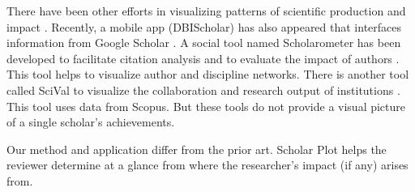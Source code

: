 There have been other efforts in visualizing patterns of scientific production and impact \cite{Katy:2010, chen2001fitting, leydesdorff2007visualization}. Recently, a mobile app (DBIScholar) has also appeared that interfaces information from Google Scholar \cite{robecke2011dbischolar}. A social tool named Scholarometer has been developed to facilitate citation analysis and to evaluate the impact of authors \cite{kaur2014scholarometer}. This tool helps to visualize author and discipline networks. There is another tool called SciVal to visualize the collaboration and research output of institutions \cite{vardell2011scival}. This tool uses data from Scopus. But these tools do not provide a visual picture of a single scholar's achievements.

Our method and application differ from the prior art. Scholar Plot helps the reviewer determine at a glance from where the researcher's impact (if any) arises from.%
